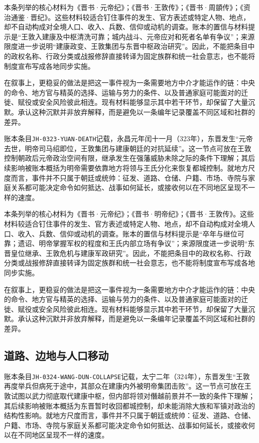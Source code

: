 本条列举的核心材料为《晋书·元帝纪》；《晋书·王敦传》；《晋书·周顗传》；《资治通鉴·晋纪》。这些材料较适合钉住事件的发生、官方表述或特定人物、地点，却不自动构成对全境人口、收入、兵数、信仰或动机的调查。账本的置信与材料提示是“王敦入建康及中枢清洗可靠；城内战斗、元帝应对和死者名单有争议”；来源限度进一步说明“建康政变、王敦集团与东晋中枢政治研究”。因此，不能把条目中的政权名称、行政分类或战报修辞直接转译为固定族群和统一社会意志，也不能将制度宣布写成各地同步实施。

在叙事上，更稳妥的做法是把这一事件视为一条需要地方中介才能运作的链：中央的命令、地方官与精英的选择、运输与劳力的条件、以及普通家庭可能面对的迁徙、赋役或安全风险彼此相连。现有材料能够显示其中若干环节，却保留了大量沉默。承认这种沉默并非放弃解释，而是避免以一条编年记录覆盖不同区域和社群的差异。

账本条目\texttt{JH-0323-YUAN-DEATH}记载，永昌元年闰十一月（323年），东晋发生“元帝去世，明帝司马绍即位，王敦集团与建康朝廷的对抗延续”。这一节点可放在王敦控制朝政后元帝政治空间有限，继承发生在强藩威胁未除之际的条件下理解；其后续影响被账本概括为明帝需要依靠地方将领与王氏分化来恢复都城控制。就地方尺度而言，事件并不只属于朝廷或统帅：征发、道路、仓储、户籍、市场、寺院与家庭关系都可能决定命令如何抵达、战事如何延长，或接收何以在不同地区呈现不一样的速度。

本条列举的核心材料为《晋书·元帝纪》；《晋书·明帝纪》；《晋书·王敦传》。这些材料较适合钉住事件的发生、官方表述或特定人物、地点，却不自动构成对全境人口、收入、兵数、信仰或动机的调查。账本的置信与材料提示是“卒年与继位可靠；遗诏、明帝掌握军权的程度和王氏内部立场有争议”；来源限度进一步说明“东晋皇位继承、王敦危机与建康军政研究”。因此，不能把条目中的政权名称、行政分类或战报修辞直接转译为固定族群和统一社会意志，也不能将制度宣布写成各地同步实施。

在叙事上，更稳妥的做法是把这一事件视为一条需要地方中介才能运作的链：中央的命令、地方官与精英的选择、运输与劳力的条件、以及普通家庭可能面对的迁徙、赋役或安全风险彼此相连。现有材料能够显示其中若干环节，却保留了大量沉默。承认这种沉默并非放弃解释，而是避免以一条编年记录覆盖不同区域和社群的差异。

\subsection{道路、边地与人口移动}

账本条目\texttt{JH-0324-WANG-DUN-COLLAPSE}记载，太宁二年（324年），东晋发生“王敦再度举兵但病死于途中，其部众在建康内外被明帝集团击败”。这一节点可放在王敦试图以武力彻底取代建康中枢，但内部将领对僭越前景并不一致的条件下理解；其后续影响被账本概括为东晋暂时收回都城控制，却未能消除大族和军镇对政治的结构性影响。就地方尺度而言，事件并不只属于朝廷或统帅：征发、道路、仓储、户籍、市场、寺院与家庭关系都可能决定命令如何抵达、战事如何延长，或接收何以在不同地区呈现不一样的速度。

